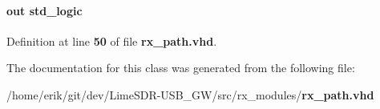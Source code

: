 \paragraph[{wrrxfifo\+\_\+wr}]{ {\bfseries \textcolor{keywordflow}{out}\textcolor{vhdlchar}{ }} {\bfseries \textcolor{comment}{std\+\_\+logic}\textcolor{vhdlchar}{ }} \hspace{0.3cm}{\ttfamily [Port]}}\label{classrx__path_a09d52597513939fa82988a76cc664ff8}


Definition at line {\bf 50} of file {\bf rx\+\_\+path.\+vhd}.



The documentation for this class was generated from the following file\+:\begin{DoxyCompactItemize}
\item 
/home/erik/git/dev/\+Lime\+S\+D\+R-\/\+U\+S\+B\+\_\+\+G\+W/src/rx\+\_\+modules/{\bf rx\+\_\+path.\+vhd}\end{DoxyCompactItemize}
